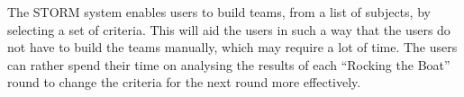 The STORM system enables users to build teams, from a list of subjects, by selecting a set of criteria. This will aid the users in such a way that the users do not have to build the teams manually, which may require a lot of time. The users can rather spend their time on analysing the results of each ``Rocking the Boat'' round to change the criteria for the next round more effectively.